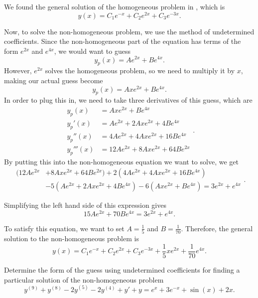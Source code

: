 \begin{exampleSol}
We found the general solution of the homogeneous problem in , which is 
\[ y(x) = C_1 e^{-x} + C_2 e^{2x}+ C_3e^{-3x}. \]

Now, to solve the non-homogeneous problem, we use the method of undetermined coefficients. Since the non-homogeneous part of the equation has terms of the form $e^{2x}$ and $e^{4x}$, we would want to guess 
\[ y_p(x) = Ae^{2x} + Be^{4x}.\] However, $e^{2x}$ solves the homogeneous problem, so we need to multiply it by $x$, making our actual guess become 
\[ y_p(x) = Axe^{2x} + Be^{4x}.\] In order to plug this in, we need to take three derivatives of this guess, which are
\[ 
\begin{split}
y_p(x) &= Axe^{2x} + Be^{4x} \\
y_p'(x) &= Ae^{2x} + 2Axe^{2x} + 4Be^{4x} \\
y_p''(x) &= 4Ae^{2x} + 4Axe^{2x} + 16Be^{4x} \\
y_p'''(x) &= 12Ae^{2x} + 8Axe^{2x} + 64Be^{2x}
\end{split}.
\]
By putting this into the non-homogeneous equation we want to solve, we get
\[
\begin{split}
(12Ae^{2x} &+ 8Axe^{2x} + 64Be^{2x}) + 2(4Ae^{2x} + 4Axe^{2x} + 16Be^{4x})\\
 & - 5(Ae^{2x} + 2Axe^{2x} + 4Be^{4x}) - 6(Axe^{2x} + Be^{4x} ) = 3e^{2x} + e^{4x}
\end{split}.
\]

Simplifying the left hand side of this expression gives
\[ 15Ae^{2x} + 70Be^{4x} = 3e^{2x} + e^{4x}. \]

To satisfy this equation, we want to set $A = \frac{1}{5}$ and $B = \frac{1}{70}$. Therefore, the general solution to the non-homogeneous problem is
\[ y(x) = C_1 e^{-x} + C_2 e^{2x}+ C_3e^{-3x} + \frac{1}{5}xe^{2x} + \frac{1}{70}e^{4x}. \]
\end{exampleSol}

\begin{example}
Determine the form of the guess using undetermined coefficients for finding a particular solution of the non-homogeneous problem
\[ y^{(9)} + y^{(8)} - 2y^{(5)} - 2y^{(4)} + y' + y = e^{x} + 3e^{-x} + \sin(x) + 2x. \]
\end{example}

